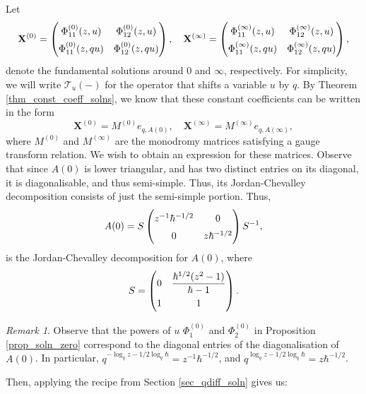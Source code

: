 \documentclass[a4paper]{report}
\theoremstyle{theorem}
\theoremstyle{definition}
\theoremstyle{remark}
\newtheorem{remark}{Remark}
\theoremstyle{proposition}
\theoremstyle{conjecture}
\theoremstyle{lemma}
\theoremstyle{corollary}
\theoremstyle{exercise}
\theoremstyle{example}
\newcommand{\mcal}{\mathcal}
\begin{document}
  Let
  $$\mathbf{X}^{(0)} = \renewcommand\arraystretch{1.5}\begin{pmatrix}
      \Phi_{11}^{(0)}(z,u) &\Phi_{12}^{(0)}(z,u)\\
      \Phi_{11}^{(0)}(z,qu)& \Phi_{12}^{(0)}(z,qu)
  \end{pmatrix}, \quad \mathbf{X}^{(\infty)} = \renewcommand\arraystretch{1.5}\begin{pmatrix}
      \Phi_{11}^{(\infty)}(z,u) & \Phi_{12}^{(\infty)}(z,u)\\
      \Phi_{11}^{(\infty)}(z,qu) & \Phi_{12}^{(\infty)}(z,qu)
  \end{pmatrix},$$
  denote the fundamental solutions around $0$ and $\infty$, respectively.
  For simplicity, we will write $\mcal{T}_{u}(-)$ for the operator that shifts 
  a variable $u$ by $q$.
  By Theorem \ref{thm_const_coeff_solns}, we know that these constant 
  coefficients can be written in the form
  $$\mathbf{X}^{(0)} = M^{(0)}e_{q,A(0)},\quad \mathbf{X}^{(\infty)} = M^{(\infty)}e_{q,A(\infty)},$$
  where $M^{(0)}$ and $M^{(\infty)}$ are the monodromy matrices satisfying a gauge
  transform relation. We wish to obtain an expression for these matrices.
  Observe that since $A(0)$ is lower triangular, and has two distinct entries on
  its diagonal, it is diagonalisable, and thus semi-simple. Thus, its 
  Jordan-Chevalley decomposition consists of just the semi-simple portion.
  Thus, 
  $$A(0) = S \renewcommand\arraystretch{1.5}\begin{pmatrix}
      z^{-1}\hbar^{-1/2} & 0\\ 
      0 & z\hbar^{-1/2}
  \end{pmatrix} S^{-1},$$
  is the Jordan-Chevalley decomposition for $A(0)$, where $$S = \renewcommand\arraystretch{1.5}\begin{pmatrix}
      0 & \displaystyle\frac{\hbar^{1/2}(z^{2}-1)}{\hbar - 1}\\
      1 & 1
  \end{pmatrix}.$$
  \begin{remark}
      Observe that the powers of $u$ $\Phi_{1}^{(0)}$ and $\Phi_{2}^{(0)}$ in Proposition \ref{prop_soln_zero} correspond 
      to the diagonal entries of the diagonalisation of $A(0)$.
      In particular, $q^{-\log_qz - 1/2\log_q\hbar} = z^{-1}\hbar^{-1/2}$,
      and $q^{\log_qz - 1/2\log_q\hbar} = z\hbar^{-1/2}$. 
  \end{remark}
  Then, applying the recipe from Section \ref{sec_qdiff_soln} gives us:
\end{document}
